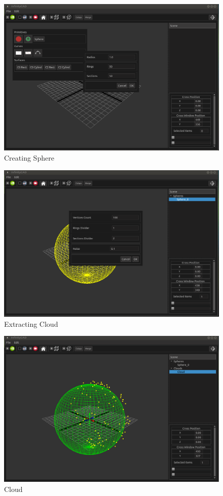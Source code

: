 \documentclass{book}
\begin{document}
\begin{figure}[H]
    \includegraphics[width=1\textwidth]{./graphics/gui/gui3.png}
    \caption{Creating Sphere}
    \label{fig:gui3}
\end{figure}

\begin{figure}[H]
    \includegraphics[width=1\textwidth]{./graphics/gui/gui6.png}
    \caption{Extracting Cloud}
    \label{fig:gui6}
\end{figure}

\begin{figure}[H]
    \includegraphics[width=1\textwidth]{./graphics/gui/gui7.png}
    \caption{Cloud}
    \label{fig:gui7}
\end{figure}
\end{document}

